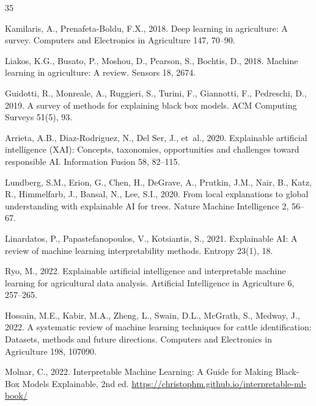 \documentclass[3p,twocolumn,authoryear]{elsarticle}
\begin{document}
\begin{thebibliography}{35}
{
Kamilaris, A., Prenafeta-Boldu, F.X., 2018.
Deep learning in agriculture: A survey.
Computers and Electronics in Agriculture 147, 70--90.

Liakos, K.G., Busato, P., Moshou, D., Pearson, S., Bochtis, D., 2018.
Machine learning in agriculture: A review.
Sensors 18, 2674.

Guidotti, R., Monreale, A., Ruggieri, S., Turini, F., Giannotti, F.,
  Pedreschi, D., 2019.
A survey of methods for explaining black box models.
ACM Computing Surveys 51(5), 93.

Arrieta, A.B., Diaz-Rodriguez, N., Del Ser, J., et~al., 2020.
Explainable artificial intelligence (XAI): Concepts, taxonomies,
  opportunities and challenges toward responsible AI.
Information Fusion 58, 82--115.

Lundberg, S.M., Erion, G., Chen, H., DeGrave, A., Prutkin, J.M.,
  Nair, B., Katz, R., Himmelfarb, J., Bansal, N., Lee, S.I., 2020.
From local explanations to global understanding with explainable AI
  for trees.
Nature Machine Intelligence 2, 56--67.

Linardatos, P., Papastefanopoulos, V., Kotsiantis, S., 2021.
Explainable AI: A review of machine learning interpretability methods.
Entropy 23(1), 18.

Ryo, M., 2022.
Explainable artificial intelligence and interpretable machine learning
  for agricultural data analysis.
Artificial Intelligence in Agriculture 6, 257--265.

Hossain, M.E., Kabir, M.A., Zheng, L., Swain, D.L., McGrath, S.,
  Medway, J., 2022.
A systematic review of machine learning techniques for cattle
  identification: Datasets, methods and future directions.
Computers and Electronics in Agriculture 198, 107090.

Molnar, C., 2022.
Interpretable Machine Learning: A Guide for Making Black-Box Models
  Explainable, 2nd ed.
\url{https://christophm.github.io/interpretable-ml-book/}

}
\end{thebibliography}
\end{document}

